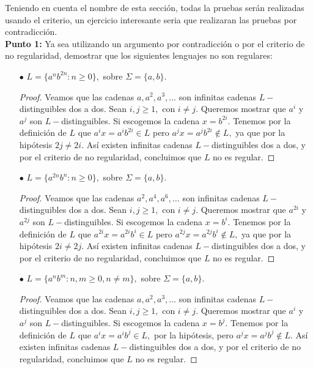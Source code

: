 
Teniendo en cuenta el nombre de esta sección, todas la pruebas serán realizadas usando el criterio, un ejercicio interesante seria que realizaran las pruebas por contradicción.\\

\textbf{Punto 1: } Ya sea utilizando un argumento por contradicción o por el criterio de no regularidad, demostrar que los siguientes lenguajes no son regulares:

\begin{itemize}
    \item[$\bullet$] $L=\{a^nb^{2n}:n\geq 0\},$ sobre $\Sigma=\{a,b\}.$
    \begin{proof}
        Veamos que las cadenas $a,a^2,a^3,\dots$ son infinitas cadenas $L-$distinguibles dos a dos. Sean $i,j\geq 1,$ con $i\neq j.$ Queremos mostrar que $a^i$ y $a^j$ son $L-$distinguibles. Si escogemos la cadena $x=b^{2i}.$ Tenemos por la definición de $L$ que $a^ix=a^ib^{2i}\in L$ pero $a^jx=a^jb^{2i}\notin L,$ ya que por la hipótesis $2j\neq2i.$ Así existen infinitas cadenas $L-$distinguibles dos a dos, y por el criterio de no regularidad, concluimos que $L$ no es regular.
    \end{proof}
    \item[$\bullet$] $L=\{a^{2n}b^n:n\geq 0\},$ sobre $\Sigma=\{a,b\}.$
    \begin{proof}
        Veamos que las cadenas $a^2,a^4,a^6,\dots$ son infinitas cadenas $L-$distinguibles dos a dos. Sean $i,j\geq 1,$ con $i\neq j.$ Queremos mostrar que $a^{2i}$ y $a^{2j}$ son $L-$distinguibles. Si escogemos la cadena $x=b^i.$ Tenemos por la definición de $L$  que $a^{2i}x=a^{2i}b^i\in L$ pero $a^{2j}x=a^{2j}b^i\notin L,$ ya que por la hipótesis $2i\neq 2j.$ Así existen infinitas cadenas $L-$distinguibles dos a dos, y por el criterio de no regularidad, concluimos que $L$ no es regular.
    \end{proof}
    \item[$\bullet$] $L=\{a^nb^m:n,m\geq 0, n\neq m\},$ sobre $\Sigma=\{a,b\}.$
    \begin{proof}
        Veamos que las cadenas $a,a^2,a^3,\dots$ son infinitas cadenas $L-$distinguibles dos a dos. Sean $i,j\geq 1,$ con $i\neq j.$ Queremos mostrar que $a^i$ y $a^j$ son $L-$distinguibles. Si escogemos la cadena $x=b^j.$ Tenemos por la definición de $L$ que $a^ix=a^ib^j\in L,$ por la hipótesis, pero $a^jx=a^jb^j\notin L.$  Así existen infinitas cadenas $L-$distinguibles dos a dos, y por el criterio de no regularidad, concluimos que $L$ no es regular.

\end{proof}
\end{itemize}
